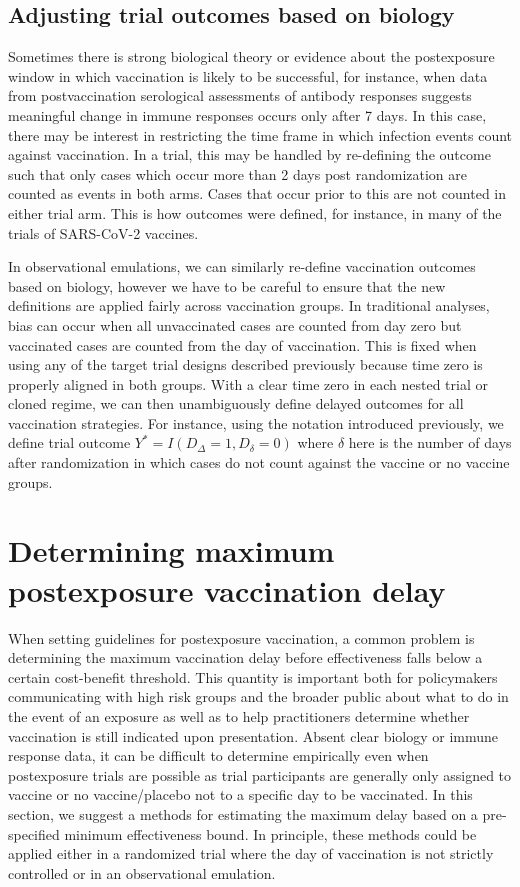 \begin{appendices}
\begin{refsection}
    \subsection{Adjusting trial outcomes based on biology} \label{sec:delayed_followup}
    Sometimes there is strong biological theory or evidence about the postexposure window in which vaccination is likely to be successful, for instance, when data from postvaccination serological assessments of antibody responses suggests meaningful change in immune responses occurs only after 7 days. In this case, there may be interest in restricting the time frame in which infection events count against vaccination. In a trial, this may be handled by re-defining the outcome such that only cases which occur more than 2 days post randomization are counted as events in both arms. Cases that occur prior to this are not counted in either trial arm. This is how outcomes were defined, for instance, in many of the trials of SARS-CoV-2 vaccines. 
        
    In observational emulations, we can similarly re-define vaccination outcomes based on biology, however we have to be careful to ensure that the new definitions are applied fairly across vaccination groups. In traditional analyses, bias can occur when all unvaccinated cases are counted from day zero but vaccinated cases are counted from the day of vaccination. This is fixed when using any of the target trial designs described previously because time zero is properly aligned in both groups. With a clear time zero in each nested trial or cloned regime, we can then unambiguously define delayed outcomes for all vaccination strategies. For instance, using the notation introduced previously, we define trial outcome $Y^* = I(D_{\Delta} = 1, D_{\delta} = 0)$ where $\delta$ here is the number of days after randomization in which cases do not count against the vaccine or no vaccine groups.

    \clearpage

    \section{Determining maximum postexposure vaccination delay} \label{sec:maxdelay}
    When setting guidelines for postexposure vaccination, a common problem is determining the maximum vaccination delay before effectiveness falls below a certain cost-benefit threshold. This quantity is important both for policymakers communicating with high risk groups and the broader public about what to do in the event of an exposure as well as to help practitioners determine whether vaccination is still indicated upon presentation. Absent clear biology or immune response data, it can be difficult to determine empirically even when postexposure trials are possible as trial participants are generally only assigned to vaccine or no vaccine/placebo not to a specific day to be vaccinated. In this section, we suggest a methods for estimating the maximum delay based on a pre-specified minimum effectiveness bound. In principle, these methods could be applied either in a randomized trial where the day of vaccination is not strictly controlled or in an observational emulation. 
 

\end{refsection}
\end{appendices}
